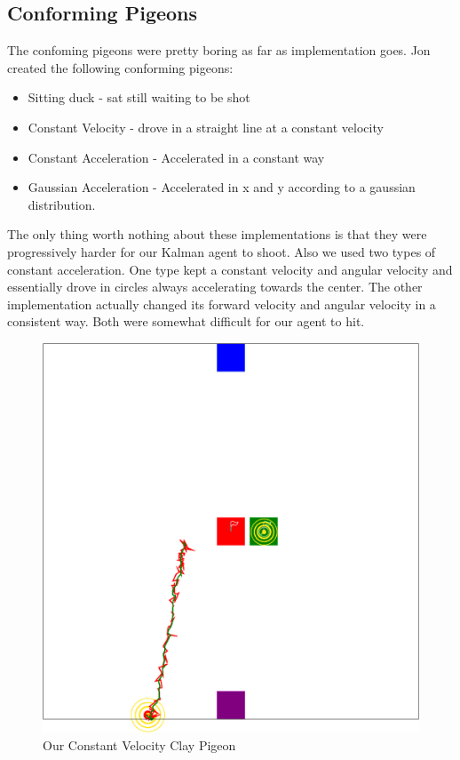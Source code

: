 \subsection{Conforming Pigeons}
The confoming pigeons were pretty boring as far as implementation goes. Jon created the following conforming pigeons:
\begin{itemize}
    \item Sitting duck - sat still waiting to be shot
    \item Constant Velocity - drove in a straight line at a constant velocity
    \item Constant Acceleration - Accelerated in a constant way
    \item Gaussian Acceleration - Accelerated in x and y according to a gaussian distribution.
\end{itemize}
The only thing worth nothing about these implementations is that they were progressively harder for our Kalman agent to shoot.  Also we used two types of constant acceleration.  One type kept a constant velocity and angular velocity and essentially drove in circles always accelerating towards the center.  The other implementation actually changed its forward velocity and angular velocity in a consistent way.  Both were somewhat difficult for our agent to hit.
\begin{figure}
   \begin{center}
   	\includegraphics[width=\textwidth]{kalman-path-cv1.png}
   \end{center}
   \caption{Our Constant Velocity Clay Pigeon}
  \end{figure}
